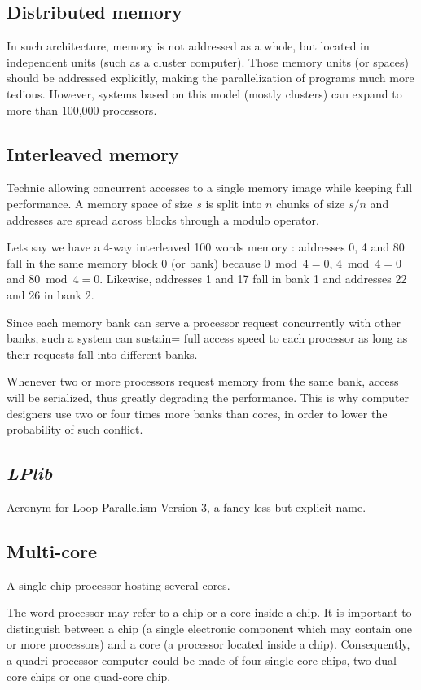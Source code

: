 \documentclass[a4paper,12pt]{article}
\begin{document}
\subsection{Distributed memory}
In such architecture, memory is not addressed as a whole, but located in independent units (such as a cluster computer). Those memory units (or spaces) should be addressed explicitly, making the parallelization of programs much more tedious. However, systems based on this model (mostly clusters) can expand to more than 100,000 processors.

\subsection{Interleaved memory}
Technic allowing concurrent accesses to a single memory image while keeping full performance. A memory space of size $s$ is split into $n$ chunks of size $s/n$ and addresses are spread across blocks through a modulo operator.

Lets say we have a 4-way interleaved 100 words memory :
addresses 0, 4 and 80 fall in the same memory block 0 (or bank) because $0 \bmod 4 = 0$, $4 \bmod 4 = 0$ and $80 \bmod 4 = 0$. Likewise, addresses 1 and 17 fall in bank 1 and addresses 22 and 26 in bank 2.

Since each memory bank can serve a processor request concurrently with other banks, such a system can sustain= full access speed to each processor as long as their requests fall into different banks.

Whenever two or more processors request memory from the same bank, access will be serialized, thus greatly degrading the performance. This is why computer designers use two or four times more banks than cores, in order to lower the probability of such conflict.

\subsection{\emph{LPlib}}
Acronym for Loop Parallelism Version 3, a fancy-less but explicit name.

\subsection{Multi-core}
A single chip processor hosting several cores.

The word processor may refer to a chip or a core inside a chip. It is important to distinguish between a chip (a single electronic component which may contain one or more processors) and a core (a processor located inside a chip). Consequently, a quadri-processor computer could be made of four single-core chips, two dual-core chips or one quad-core chip.
\end{document}
